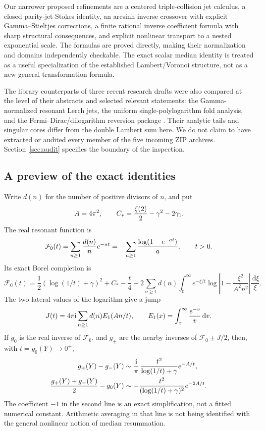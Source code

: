 \documentclass[11pt,a4paper]{article}
\numberwithin{equation}{section}
\theoremstyle{definition}\newtheorem{definition}[theorem]{Definition}
\theoremstyle{remark}\newtheorem{remark}[theorem]{Remark}
\newcommand{\dd}{\,\mathrm d}
\newcommand{\ii}{\mathrm i}
\newcommand{\F}{\mathcal F}\newcommand{\CC}{\mathcal C}
\begin{document}
Our narrower proposed refinements are a centered triple-collision jet
calculus, a closed parity-jet Stokes identity, an arcsinh inverse crossover
with explicit Gamma--Stieltjes corrections, a finite rational inverse
coefficient formula with sharp structural consequences, and explicit
nonlinear transport to a nested exponential scale. The formulas are
proved directly, making their normalization and domains independently
checkable. The exact scalar median identity is treated as a useful
specialization of the established Lambert/Voronoi structure, not as a new
general transformation formula.

The library counterparts of three recent research drafts were also
compared at the level of their abstracts and selected relevant
statements: the Gamma-normalized resonant Lerch jets, the uniform
single-polylogarithm fold analysis, and the Fermi--Dirac/dilogarithm
reversion package \cite{prior-jets,prior-folds,prior-fermi}.
Their analytic tails and singular cores differ from the double Lambert
sum here. We do not claim to have extracted or audited every member of
the five incoming ZIP archives. Section~\ref{sec:audit} specifies the
boundary of the inspection.

\subsection{A preview of the exact identities}
Write $d(n)$ for the number of positive divisors of $n$, and put
\begin{equation}\label{eq:A}
 A=4\pi^2,\qquad
 C_*={\zeta(2)\over2}-\gamma^2-2\gamma_1.
\end{equation}
The real resonant function is
\[
 \F_0(t)=\sum_{n\ge1}{d(n)\over n}e^{-nt}
        =-\sum_{a\ge1}{\log(1-e^{-at})\over a},\qquad t>0.
\]
Its exact Borel completion is
\begin{equation}\label{eq:preview-median}
 \F_0(t)=\frac12(\log(1/t)+\gamma)^2+C_*-\frac t4
 -2\sum_{n\ge1}d(n)\int_0^\infty
 e^{-\xi/t}\log\left|1-\frac{\xi^2}{A^2n^2}\right|\frac{\dd\xi}{\xi}.
\end{equation}
The two lateral values of the logarithm give a jump
\begin{equation}\label{eq:preview-jump}
 J(t)=4\pi\ii\sum_{n\ge1}d(n)E_1(An/t),\qquad
 E_1(x)=\int_x^\infty{e^{-v}\over v}\dd v.
\end{equation}
If $g_0$ is the real inverse of $\F_0$, and $g_\pm$ are the nearby
inverses of $\F_0\pm J/2$, then, with $t=g_0(Y)\to0^+$,
\begin{align}
 g_+(Y)-g_-(Y)
 &\sim {\ii\over\pi}\,{t^2\over\log(1/t)+\gamma}e^{-A/t},
 \label{eq:preview-inverse-jump}\\
 \frac{g_+(Y)+g_-(Y)}2-g_0(Y)
 &\sim -{t^2\over(\log(1/t)+\gamma)^2}e^{-2A/t}.
 \label{eq:preview-bias}
\end{align}
The coefficient $-1$ in the second line is an exact simplification, not a
fitted numerical constant. Arithmetic averaging in that line is not being
identified with the general nonlinear notion of median resummation.
\end{document}
